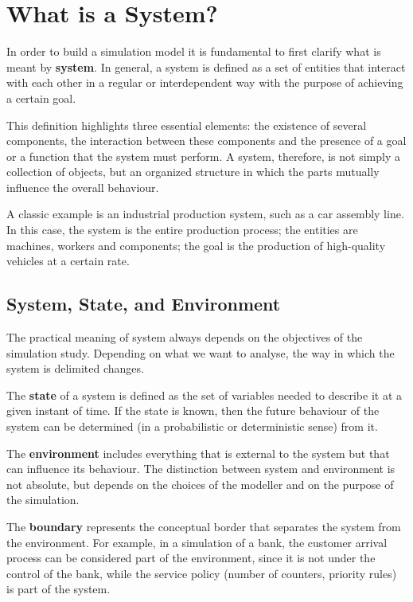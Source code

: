 \section{What is a System?}

In order to build a simulation model it is fundamental to first clarify what is meant by \textbf{system}. In general, a system is defined as a set of entities that interact with each other in a regular or interdependent way with the purpose of achieving a certain goal.

This definition highlights three essential elements: the existence of several components, the interaction between these components and the presence of a goal or a function that the system must perform. A system, therefore, is not simply a collection of objects, but an organized structure in which the parts mutually influence the overall behaviour.

A classic example is an industrial production system, such as a car assembly line. In this case, the system is the entire production process; the entities are machines, workers and components; the goal is the production of high-quality vehicles at a certain rate.

\subsection{System, State, and Environment}

The practical meaning of system always depends on the objectives of the simulation study. Depending on what we want to analyse, the way in which the system is delimited changes.

The \textbf{state} of a system is defined as the set of variables needed to describe it at a given instant of time. If the state is known, then the future behaviour of the system can be determined (in a probabilistic or deterministic sense) from it.

The \textbf{environment} includes everything that is external to the system but that can influence its behaviour. The distinction between system and environment is not absolute, but depends on the choices of the modeller and on the purpose of the simulation.

The \textbf{boundary} represents the conceptual border that separates the system from the environment. For example, in a simulation of a bank, the customer arrival process can be considered part of the environment, since it is not under the control of the bank, while the service policy (number of counters, priority rules) is part of the system.

